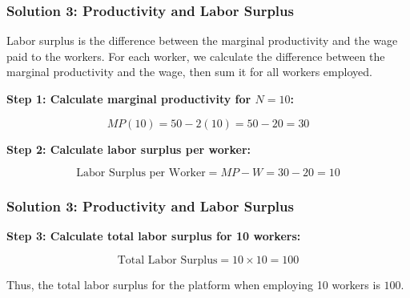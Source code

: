 \documentclass{beamer}
\begin{document}



\begin{frame}
\frametitle{Solution 3: Productivity and Labor Surplus}

Labor surplus is the difference between the marginal productivity and the wage paid to the workers. For each worker, we calculate the difference between the marginal productivity and the wage, then sum it for all workers employed.

\textbf{Step 1: Calculate marginal productivity for \(N = 10\):}

\[
MP(10) = 50 - 2(10) = 50 - 20 = 30
\]

\textbf{Step 2: Calculate labor surplus per worker:}

\[
\text{Labor Surplus per Worker} = MP - W = 30 - 20 = 10
\]


\end{frame}



\begin{frame}
\frametitle{Solution 3: Productivity and Labor Surplus}


\textbf{Step 3: Calculate total labor surplus for 10 workers:}

\[
\text{Total Labor Surplus} = 10 \times 10 = 100
\]

Thus, the total labor surplus for the platform when employing 10 workers is \(\boxed{100}\).
\end{frame}
\end{document}
